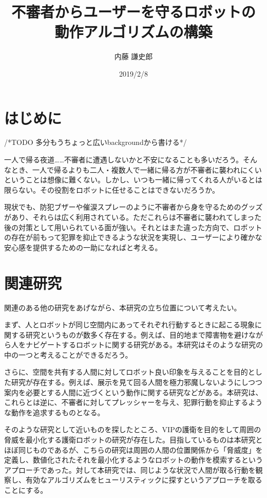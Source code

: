\documentclass[12pt,titlepage]{jsarticle}
\title{不審者からユーザーを守るロボットの\\動作アルゴリズムの構築}
\author{内藤 謙史郎}
\date{2019/2/8}
\begin{document}
\maketitle
\section{はじめに}

/*TODO 多分もうちょっと広いbackgroundから書ける*/


一人で帰る夜道……不審者に遭遇しないかと不安になることも多いだろう。そんなとき、一人で帰るよりも二人・複数人で一緒に帰る方が不審者に襲われにくいということは想像に難くない。しかし、いつも一緒に帰ってくれる人がいるとは限らない。その役割をロボットに任せることはできないだろうか。

現状でも、防犯ブザーや催涙スプレーのように不審者から身を守るためのグッズがあり、それらは広く利用されている。ただこれらは不審者に襲われてしまった後の対策として用いられている面が強い。それとはまた違った方向で、ロボットの存在が前もって犯罪を抑止できるような状況を実現し、ユーザーにより確かな安心感を提供するための一助になればと考える。

\section{関連研究}
関連のある他の研究をあげながら、本研究の立ち位置について考えたい。

まず、人とロボットが同じ空間内にあってそれぞれ行動するときに起こる現象に関する研究というものが数多く存在する。例えば、目的地まで障害物を避けながら人をナビゲートするロボットに関する研究がある\cite{1}。本研究はそのような研究の中の一つと考えることができるだろう。

さらに、空間を共有する人間に対してロボット良い印象を与えることを目的とした研究が存在する。例えば、展示を見て回る人間を極力邪魔しないようにしつつ案内を必要とする人間に近づくという動作に関する研究\cite{2}などがある。本研究は、これらとは逆に、不審者に対してプレッシャーを与え、犯罪行動を抑止するような動作を追求するものとなる。

そのような研究として近いものを探したところ、VIPの護衛を目的をして周囲の脅威を最小化する護衛ロボットの研究\cite{3}が存在した。目指しているものは本研究とほぼ同じものであるが、こちらの研究\cite{3}は周囲の人間の位置関係から「脅威度」を定義し、数値化されたそれを最小化するようなロボットの動作を模索するというアプローチであった。対して本研究では、同じような状況で人間が取る行動を観察し、有効なアルゴリズムをヒューリスティックに探すというアプローチを取ることにする。
\end{document}
